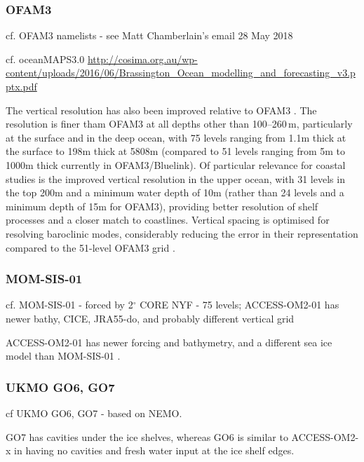 \documentclass[11pt]{article}
\begin{document}
\subsubsection{OFAM3}
cf. OFAM3 namelists - see Matt Chamberlain's email 28 May 2018

cf. oceanMAPS3.0  \url{http://cosima.org.au/wp-content/uploads/2016/06/Brassington_Ocean_modelling_and_forecasting_v3.pptx.pdf} %

The vertical resolution has also been improved relative to OFAM3 \citep{OkeETAL2013a}. 
The resolution is finer tham OFAM3 at all depths other than 100--260\,m, particularly at the surface and in the deep ocean, with 75 levels ranging from 1.1m thick at the surface to 198m thick at 5808m (compared to 51 levels ranging from 5m to 1000m thick currently in OFAM3/Bluelink). 
Of particular relevance for coastal studies is the improved vertical resolution in the upper ocean, with 31 levels in the top 200m and a minimum water depth of 10m (rather than 24 levels and a minimum depth of 15m for OFAM3), providing better resolution of shelf processes and a closer match to coastlines. 
Vertical spacing is optimised for resolving baroclinic modes, considerably reducing the error in their representation compared to the 51-level OFAM3 grid \citep[][ table~1]{StewartHoggGriffiesHeerdegenWardSpenceEngland2017a}.

\citet{FengZhangOkeMonselesanChamberlainMatearSchiller2016a}

\subsubsection{MOM-SIS-01}
cf. MOM-SIS-01 \citet{SpenceHolmesHoggGriffiesStewartEngland2017a} - forced by 2$^\circ$ CORE NYF - 75 levels; ACCESS-OM2-01 has newer bathy, CICE, JRA55-do, and probably different vertical grid

ACCESS-OM2-01 has newer forcing and bathymetry, and a different sea ice model than MOM-SIS-01 \cite{SpenceHolmesHoggGriffiesStewartEngland2017a}.

\subsubsection{UKMO GO6, GO7}
cf UKMO GO6, GO7 \citet{StorkeyBlakerMathiotMegannAksenovBlockleyCalvertGrahamHewitt2018a} - based on NEMO.

GO7 has cavities under the ice shelves, whereas GO6 is similar to ACCESS-OM2-x in having no cavities and fresh water input at the ice shelf edges.
\end{document}

